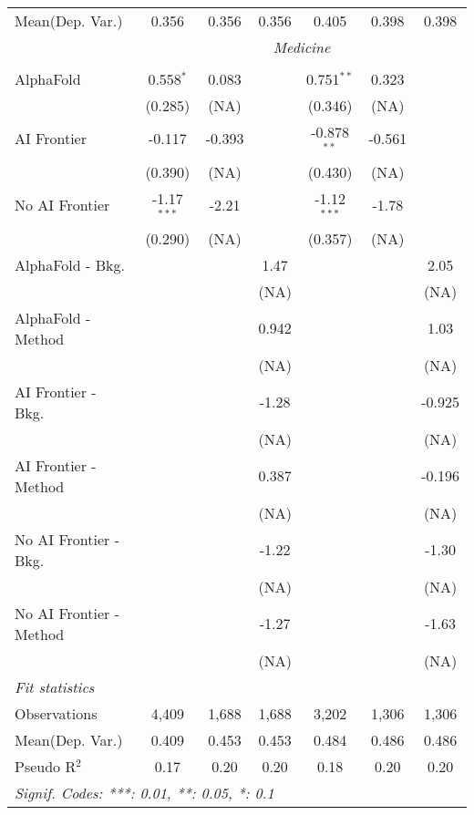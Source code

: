 \begin{tabular}{lcccccc}
Mean(Dep. Var.) & 0.356 & 0.356 & 0.356 & 0.405 & 0.398 & 0.398 \\
 & \multicolumn{6}{c}{\textit{Medicine}} \\ \\
   AlphaFold               & 0.558$^{*}$   & 0.083  &       & 0.751$^{**}$  & 0.323  &   \\   
                           & (0.285)       & (NA)   &       & (0.346)       & (NA)   &   \\   
   AI Frontier             & -0.117        & -0.393 &       & -0.878$^{**}$ & -0.561 &   \\   
                           & (0.390)       & (NA)   &       & (0.430)       & (NA)   &   \\   
   No AI Frontier          & -1.17$^{***}$ & -2.21  &       & -1.12$^{***}$ & -1.78  &   \\   
                           & (0.290)       & (NA)   &       & (0.357)       & (NA)   &   \\   
   AlphaFold - Bkg.        &               &        & 1.47  &               &        & 2.05\\   
                           &               &        & (NA)  &               &        & (NA)\\   
   AlphaFold - Method      &               &        & 0.942 &               &        & 1.03\\   
                           &               &        & (NA)  &               &        & (NA)\\   
   AI Frontier - Bkg.      &               &        & -1.28 &               &        & -0.925\\   
                           &               &        & (NA)  &               &        & (NA)\\   
   AI Frontier - Method    &               &        & 0.387 &               &        & -0.196\\   
                           &               &        & (NA)  &               &        & (NA)\\   
   No AI Frontier - Bkg.   &               &        & -1.22 &               &        & -1.30\\   
                           &               &        & (NA)  &               &        & (NA)\\   
   No AI Frontier - Method &               &        & -1.27 &               &        & -1.63\\   
                           &               &        & (NA)  &               &        & (NA)\\   
   \midrule
   \emph{Fit statistics}\\
   Observations            & 4,409         & 1,688  & 1,688 & 3,202         & 1,306  & 1,306\\  
Mean(Dep. Var.) & 0.409 & 0.453 & 0.453 & 0.484 & 0.486 & 0.486 \\
   Pseudo R$^2$            & 0.17          & 0.20   & 0.20  & 0.18          & 0.20   & 0.20\\  
   \midrule \midrule
   \multicolumn{7}{l}{\emph{Signif. Codes: ***: 0.01, **: 0.05, *: 0.1}}\\
\end{tabular}
\par\endgroup
